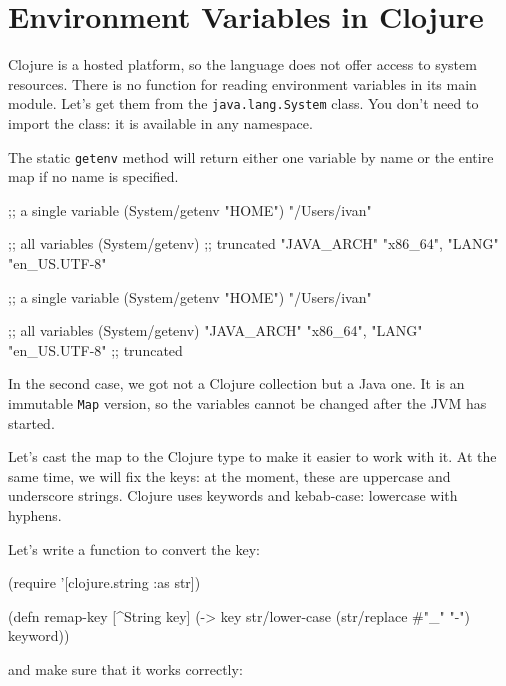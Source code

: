 \section{ Environment Variables in Clojure}


Clojure is a hosted platform, so the language does not offer access to system resources. There is no function for reading environment variables in its main module. Let's get them from the \verb|java.lang.System| class. You don't need to import the class: it is available in any namespace.

The static \verb|getenv| method will return either one variable by name or the entire map if no name is specified.

\ifnarrow

\begin{clojure}
;; a single variable
(System/getenv "HOME")
"/Users/ivan"

;; all variables
(System/getenv)
;; truncated
{"JAVA_ARCH" "x86_64",
 "LANG" "en_US.UTF-8"}
\end{clojure}

\else

\begin{clojure}
;; a single variable
(System/getenv "HOME")
"/Users/ivan"

;; all variables
(System/getenv)
{"JAVA_ARCH" "x86_64", "LANG" "en_US.UTF-8"} ;; truncated
\end{clojure}

\fi

In the second case, we got not a Clojure collection but a Java one. It is an immutable \verb|Map| version, so the variables cannot be changed after the JVM has started.

Let's cast the map to the Clojure type to make it easier to work with it. At the same time, we will fix the keys: at the moment, these are uppercase and underscore strings. Clojure uses keywords and kebab-case: lowercase with hyphens.

Let's write a function to convert the key:

\begin{clojure}
(require '[clojure.string :as str])

(defn remap-key [^String key]
  (-> key
      str/lower-case
      (str/replace #"_" "-")
      keyword))
\end{clojure}

\noindent
and make sure that it works correctly:

